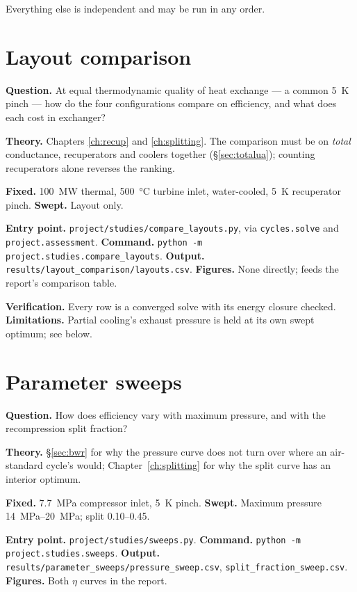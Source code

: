 \documentclass[11pt,a4paper]{report}
\newcommand{\code}[1]{\texttt{\small #1}}
\begin{document}
Everything else is independent and may be run in any order.

\section{Layout comparison}

\textbf{Question.} At equal thermodynamic quality of heat exchange ---
a common \SI{5}{\kelvin} pinch --- how do the four configurations
compare on efficiency, and what does each cost in exchanger?

\textbf{Theory.} Chapters \ref{ch:recup} and \ref{ch:splitting}. The
comparison must be on \emph{total} conductance, recuperators and
coolers together (\S\ref{sec:totalua}); counting recuperators alone
reverses the ranking.

\textbf{Fixed.} \SI{100}{\mega\watt} thermal, \SI{500}{\celsius}
turbine inlet, water-cooled, \SI{5}{\kelvin} recuperator pinch.
\textbf{Swept.} Layout only.

\textbf{Entry point.} \code{project/studies/compare\_layouts.py}, via
\code{cycles.solve} and \code{project.assessment}.
\textbf{Command.} \code{python -m project.studies.compare\_layouts}.
\textbf{Output.} \code{results/layout\_comparison/layouts.csv}.
\textbf{Figures.} None directly; feeds the report's comparison table.

\textbf{Verification.} Every row is a converged solve with its energy
closure checked. \textbf{Limitations.} Partial cooling's exhaust
pressure is held at its own swept optimum; see below.

\section{Parameter sweeps}

\textbf{Question.} How does efficiency vary with maximum pressure, and
with the recompression split fraction?

\textbf{Theory.} \S\ref{sec:bwr} for why the pressure curve does not
turn over where an air-standard cycle's would; Chapter~\ref{ch:splitting}
for why the split curve has an interior optimum.

\textbf{Fixed.} \SI{7.7}{\mega\pascal} compressor inlet,
\SI{5}{\kelvin} pinch. \textbf{Swept.} Maximum pressure
\SIrange{14}{20}{\mega\pascal}; split \numrange{0.10}{0.45}.

\textbf{Entry point.} \code{project/studies/sweeps.py}.
\textbf{Command.} \code{python -m project.studies.sweeps}.
\textbf{Output.} \code{results/parameter\_sweeps/pressure\_sweep.csv},
\code{split\_fraction\_sweep.csv}.
\textbf{Figures.} Both $\eta$ curves in the report.
\end{document}
